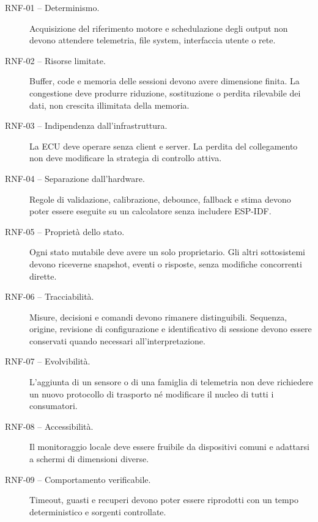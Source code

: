 \documentclass{article}
\begin{document}
\begin{description}
    \item[RNF-01 -- Determinismo.] Acquisizione del riferimento motore e
          schedulazione degli output non devono attendere telemetria, file
          system, interfaccia utente o rete.

    \item[RNF-02 -- Risorse limitate.] Buffer, code e memoria delle sessioni
          devono avere dimensione finita. La congestione deve produrre
          riduzione, sostituzione o perdita rilevabile dei dati, non crescita
          illimitata della memoria.

    \item[RNF-03 -- Indipendenza dall'infrastruttura.] La ECU deve operare senza
          client e server. La perdita del collegamento non deve modificare la
          strategia di controllo attiva.

    \item[RNF-04 -- Separazione dall'hardware.] Regole di validazione,
          calibrazione, debounce, fallback e stima devono poter essere eseguite
          su un calcolatore senza includere ESP-IDF.

    \item[RNF-05 -- Proprietà dello stato.] Ogni stato mutabile deve avere un
          solo proprietario. Gli altri sottosistemi devono riceverne snapshot,
          eventi o risposte, senza modifiche concorrenti dirette.

    \item[RNF-06 -- Tracciabilità.] Misure, decisioni e comandi devono rimanere
          distinguibili. Sequenza, origine, revisione di configurazione e
          identificativo di sessione devono essere conservati quando necessari
          all'interpretazione.

    \item[RNF-07 -- Evolvibilità.] L'aggiunta di un sensore o di una famiglia di
          telemetria non deve richiedere un nuovo protocollo di trasporto né
          modificare il nucleo di tutti i consumatori.

    \item[RNF-08 -- Accessibilità.] Il monitoraggio locale deve essere fruibile
          da dispositivi comuni e adattarsi a schermi di dimensioni diverse.

    \item[RNF-09 -- Comportamento verificabile.] Timeout, guasti e recuperi
          devono poter essere riprodotti con un tempo deterministico e sorgenti
          controllate.
\end{description}
\end{document}
